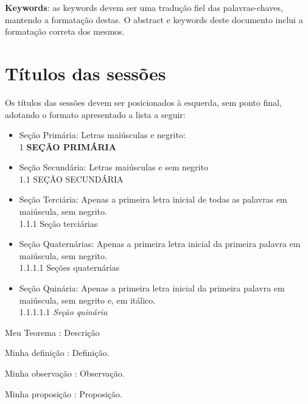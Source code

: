 \documentclass[a4,12pt]{modelo}
\begin{document}
\textbf{Keywords}: as keywords devem ser uma tradução fiel das palavras-chaves, mantendo a formatação destas. O abstract e keywords deste documento inclui a formatação correta dos mesmos. 

\section{Títulos das sessões} Os títulos das sessões devem ser posicionados à esquerda, sem ponto final, adotando o formato apresentado a lista a seguir:  
\begin{itemize}
 \item Seção Primária: Letras maiúsculas e negrito: \\ 
  1 \textbf{SEÇÃO PRIMÁRIA}\\
\item Seção Secundária: Letras maiúsculas e sem negrito \\ 
  1.1 SEÇÃO SECUNDÁRIA \\ 
\item Seção Terciária: Apenas a primeira letra inicial de todas as palavras em maiúscula, sem negrito. \\  
  1.1.1 Seção terciárias
\item Seção Quaternárias: Apenas a primeira letra inicial da primeira palavra em maiúscula, sem negrito. \\ 
  1.1.1.1 Seções quaternárias \\ 
\item Seção Quinária:  Apenas a primeira letra inicial da primeira palavra em maiúscula, sem negrito e, em itálico. \\ 
  1.1.1.1.1 \textit{Seção quinária}
\end{itemize} 
 

  
\begin{teorema}
\item[Meu Teorema]: Descrição
\end{teorema} 
 
\begin{defi}
	\item[Minha definição]: Definição.
\end{defi}   

\begin{obs}
	\item[Minha observação]: Observação.
\end{obs}  

\begin{prop}
	\item[Minha proposição]: Proposição.
\end{prop}  
 
\end{document}
